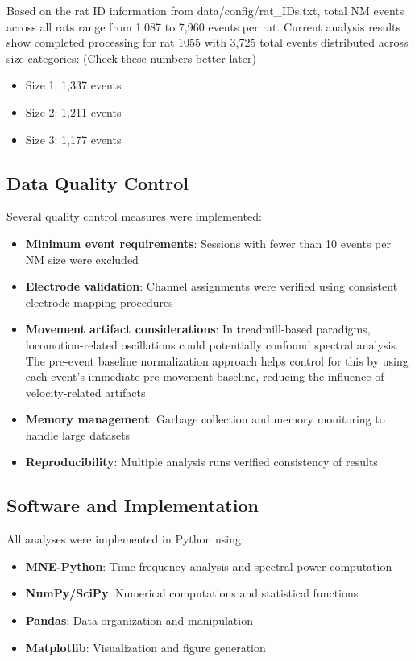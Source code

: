 \documentclass[11pt]{article}
\begin{document}
Based on the rat ID information from data/config/rat\_IDs.txt, total NM events across all rats range from 1,087 to 7,960 events per rat. Current analysis results show completed processing for rat 1055 with 3,725 total events distributed across size categories: (Check these numbers better later)
\begin{itemize}
\item Size 1: 1,337 events
\item Size 2: 1,211 events
\item Size 3: 1,177 events
\end{itemize}

\subsection{Data Quality Control}

Several quality control measures were implemented:

\begin{itemize}
\item \textbf{Minimum event requirements}: Sessions with fewer than 10 events per NM size were excluded
\item \textbf{Electrode validation}: Channel assignments were verified using consistent electrode mapping procedures
\item \textbf{Movement artifact considerations}: In treadmill-based paradigms, locomotion-related oscillations could potentially confound spectral analysis. The pre-event baseline normalization approach helps control for this by using each event's immediate pre-movement baseline, reducing the influence of velocity-related artifacts
\item \textbf{Memory management}: Garbage collection and memory monitoring to handle large datasets
\item \textbf{Reproducibility}: Multiple analysis runs verified consistency of results
\end{itemize}

\subsection{Software and Implementation}

All analyses were implemented in Python using:
\begin{itemize}
\item \textbf{MNE-Python}: Time-frequency analysis and spectral power computation
\item \textbf{NumPy/SciPy}: Numerical computations and statistical functions
\item \textbf{Pandas}: Data organization and manipulation
\item \textbf{Matplotlib}: Visualization and figure generation
\end{itemize}
\end{document}
